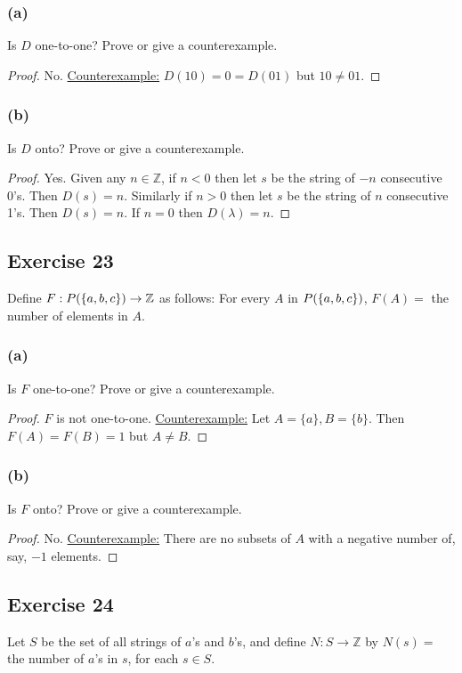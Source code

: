 \documentclass[14pt]{extarticle}
\let\mathscr\relax
\newcommand{\ps}{\mathscr{P}} %
\newcommand{\Z}{\mathbb{Z}}
\begin{document}
\subsubsection{(a)}
Is $D$ one-to-one? Prove or give a counterexample.

\begin{proof}
No. \underline{Counterexample:} \(D(10) = 0 = D(01)\) but \(10 \neq 01\).
\end{proof}

\subsubsection{(b)}
Is $D$ onto? Prove or give a counterexample.

\begin{proof}
Yes. Given any $n \in \Z$, if $n < 0$ then let $s$ be the string of $-n$ consecutive 0's. Then $D(s) = n$.
Similarly if $n > 0$ then let $s$ be the string of $n$ consecutive 1's. Then $D(s) = n$.
If $n = 0$ then $D(\lambda) = n$.
\end{proof}

\subsection{Exercise 23}
Define \(F: \ps(\{a, b, c\}) \to \Z\) as follows: For every
$A$ in \(\ps(\{a, b, c\})\), \(F(A) =\) the number of 
elements in $A$.

\subsubsection{(a)}
Is $F$ one-to-one? Prove or give a counterexample. 

\begin{proof}
$F$ is not one-to-one. \underline{Counterexample:} Let \(A = \{a\}, B = \{b\}\). Then \(F(A) = F(B) = 1\) but \(A \neq B\).
\end{proof}

\subsubsection{(b)}
Is $F$ onto? Prove or give a counterexample. 

\begin{proof}
No. \underline{Counterexample:} There are no subsets of $A$ with a negative number of, say, $-1$ elements.
\end{proof}

\subsection{Exercise 24}
Let $S$ be the set of all strings of $a$’s and $b$’s, and define \(N: S \to \Z\) by \(N(s) =\) the number of $a$’s in 
$s$, for each \(s \in S\).
\end{document}
